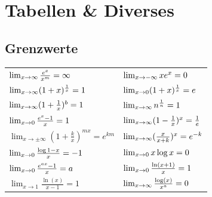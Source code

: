 \clearpage
\section{Tabellen \& Diverses}

\subsection{Grenzwerte}
\renewcommand*{\arraystretch}{2}
\begin{center}
	\begin{tabularx}{\linewidth}{XX}
		\toprule
		$\lim_{x\to\infty} \frac{e^x}{x^m} = \infty$                      & $\lim_{x\to-\infty} xe^x = 0$                        \\
		$\lim_{x\to\infty} (1+x)^{\frac{1}{x}} = 1$                       & $\lim_{x\to 0} (1+x)^{\frac{1}{x}} = e$         \\
		$\lim_{x\to\infty} (1+\frac{1}{x})^b = 1$                         & $\lim_{x\to\infty} n^{\frac{1}{n}} = 1$             \\
		$\lim_{x\to 0} \frac{e^x-1}{x} = 1$                           & $\lim_{x\to\infty} (1-\frac{1}{x})^x = \frac{1}{e}$ \\
		$\lim_{x\to\pm\infty} (1 + \frac{k}{x})^{mx} = e^{km}$ & $\lim_{x\to\infty} (\frac{x}{x+k})^x = e^{-k}$      \\
		$\lim_{x\to 0} \frac{\log 1 - x}{x} = -1$                     & $\lim_{x\to 0} x \log x = 0$                    \\
		$\lim_{x\to 0} \frac{e^{ax}-1}{x} = a$                        & $\lim_{x\to 0} \frac{\ln(x+1)}{x} = 1$          \\
		$\lim_{x\to 1} \frac{\ln(x)}{x-1} = 1$                 & $\lim_{x\to\infty} \frac{\log(x)}{x^a} = 0$         \\
		\bottomrule
	\end{tabularx}
\end{center}

